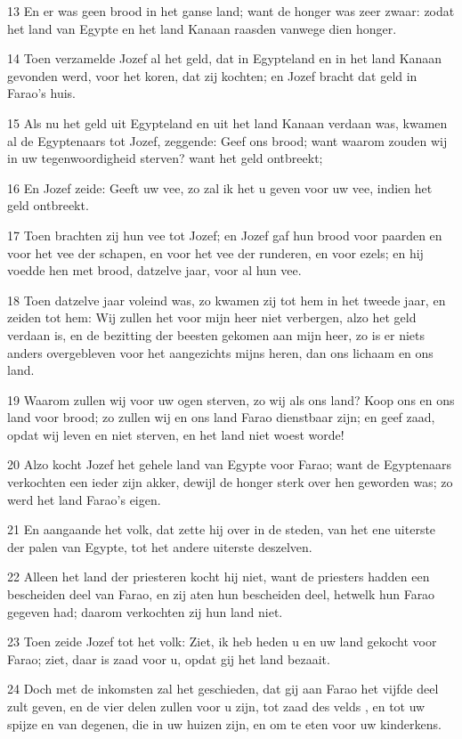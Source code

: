 \par 13 En er was geen brood in het ganse land; want de honger was zeer zwaar: zodat het land van Egypte en het land Kanaan raasden vanwege dien honger.
\par 14 Toen verzamelde Jozef al het geld, dat in Egypteland en in het land Kanaan gevonden werd, voor het koren, dat zij kochten; en Jozef bracht dat geld in Farao's huis.
\par 15 Als nu het geld uit Egypteland en uit het land Kanaan verdaan was, kwamen al de Egyptenaars tot Jozef, zeggende: Geef ons brood; want waarom zouden wij in uw tegenwoordigheid sterven? want het geld ontbreekt;
\par 16 En Jozef zeide: Geeft uw vee, zo zal ik het u geven voor uw vee, indien het geld ontbreekt.
\par 17 Toen brachten zij hun vee tot Jozef; en Jozef gaf hun brood voor paarden en voor het vee der schapen, en voor het vee der runderen, en voor ezels; en hij voedde hen met brood, datzelve jaar, voor al hun vee.
\par 18 Toen datzelve jaar voleind was, zo kwamen zij tot hem in het tweede jaar, en zeiden tot hem: Wij zullen het voor mijn heer niet verbergen, alzo het geld verdaan is, en de bezitting der beesten gekomen aan mijn heer, zo is er niets anders overgebleven voor het aangezichts mijns heren, dan ons lichaam en ons land.
\par 19 Waarom zullen wij voor uw ogen sterven, zo wij als ons land? Koop ons en ons land voor brood; zo zullen wij en ons land Farao dienstbaar zijn; en geef zaad, opdat wij leven en niet sterven, en het land niet woest worde!
\par 20 Alzo kocht Jozef het gehele land van Egypte voor Farao; want de Egyptenaars verkochten een ieder zijn akker, dewijl de honger sterk over hen geworden was; zo werd het land Farao's eigen.
\par 21 En aangaande het volk, dat zette hij over in de steden, van het ene uiterste der palen van Egypte, tot het andere uiterste deszelven.
\par 22 Alleen het land der priesteren kocht hij niet, want de priesters hadden een bescheiden deel van Farao, en zij aten hun bescheiden deel, hetwelk hun Farao gegeven had; daarom verkochten zij hun land niet.
\par 23 Toen zeide Jozef tot het volk: Ziet, ik heb heden u en uw land gekocht voor Farao; ziet, daar is zaad voor u, opdat gij het land bezaait.
\par 24 Doch met de inkomsten zal het geschieden, dat gij aan Farao het vijfde deel zult geven, en de vier delen zullen voor u zijn, tot zaad des velds , en tot uw spijze en van degenen, die in uw huizen zijn, en om te eten voor uw kinderkens.
